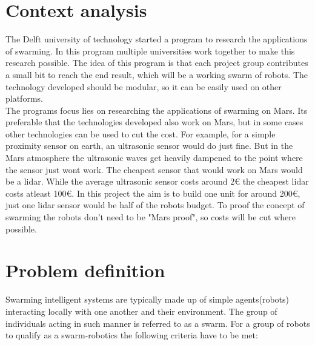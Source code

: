 \documentclass[10pt,a4paper]{article}
\begin{document}
\section{Context analysis}
The Delft university of technology started a program to research the applications of swarming. In this program multiple universities work together to make this research possible. The idea of this program is that each project group contributes a small bit to reach the end result, which will be a working swarm of robots. The technology developed should be modular, so it can be easily used on other platforms.\\The programs focus lies on researching the applications of swarming on Mars. Its preferable that the technologies developed also work on Mars, but in some cases other technologies can be used to cut the cost. For example, for a simple proximity sensor on earth, an ultrasonic sensor would do just fine. But in the Mars atmosphere the ultrasonic waves get heavily dampened to the point where the sensor just wont work\cite{soundonmars}. The cheapest sensor that would work on Mars would be a lidar\cite{lidarmars}. While the average ultrasonic sensor costs around 2$\euro$ the cheapest lidar costs atleast 100$\euro$. In this project the aim is to build one unit for around 200$\euro$, just one lidar sensor would be half of the robots budget. To proof the concept of swarming the robots don't need to be "Mars proof", so costs will be cut where possible.\\

\section{Problem definition}
Swarming intelligent systems are typically made up of simple agents(robots) interacting locally with one another and their environment. The group of individuals acting in such manner is referred to as a swarm\cite{swarmintelligence}. For a group of robots to qualify as a swarm-robotics the following criteria have to be met:
\end{document}
